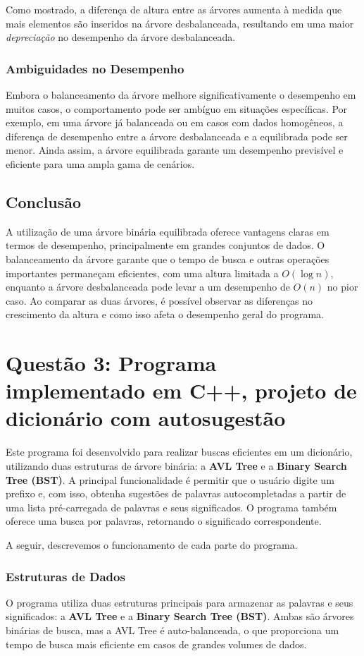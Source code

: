\documentclass{article}
\begin{document}
Como mostrado, a diferença de altura entre as árvores aumenta à medida que mais elementos são inseridos na árvore desbalanceada, resultando em uma maior \textit{depreciação} no desempenho da árvore desbalanceada.

\subsubsection{Ambiguidades no Desempenho}
Embora o balanceamento da árvore melhore significativamente o desempenho em muitos casos, o comportamento pode ser ambíguo em situações específicas. Por exemplo, em uma árvore já balanceada ou em casos com dados homogêneos, a diferença de desempenho entre a árvore desbalanceada e a equilibrada pode ser menor. Ainda assim, a árvore equilibrada garante um desempenho previsível e eficiente para uma ampla gama de cenários.

\subsection{Conclusão}
A utilização de uma árvore binária equilibrada oferece vantagens claras em termos de desempenho, principalmente em grandes conjuntos de dados. O balanceamento da árvore garante que o tempo de busca e outras operações importantes permaneçam eficientes, com uma altura limitada a \(O(\log n)\), enquanto a árvore desbalanceada pode levar a um desempenho de \(O(n)\) no pior caso. Ao comparar as duas árvores, é possível observar as diferenças no crescimento da altura e como isso afeta o desempenho geral do programa.


\section{Questão 3: Programa implementado em C++, projeto de dicionário com autosugestão}

Este programa foi desenvolvido para realizar buscas eficientes em um dicionário, utilizando duas estruturas de árvore binária: a \textbf{AVL Tree} e a \textbf{Binary Search Tree (BST)}. A principal funcionalidade é permitir que o usuário digite um prefixo e, com isso, obtenha sugestões de palavras autocompletadas a partir de uma lista pré-carregada de palavras e seus significados. O programa também oferece uma busca por palavras, retornando o significado correspondente.

A seguir, descrevemos o funcionamento de cada parte do programa.

\subsubsection{Estruturas de Dados}
O programa utiliza duas estruturas principais para armazenar as palavras e seus significados: a \textbf{AVL Tree} e a \textbf{Binary Search Tree (BST)}. Ambas são árvores binárias de busca, mas a AVL Tree é auto-balanceada, o que proporciona um tempo de busca mais eficiente em casos de grandes volumes de dados.
\end{document}
